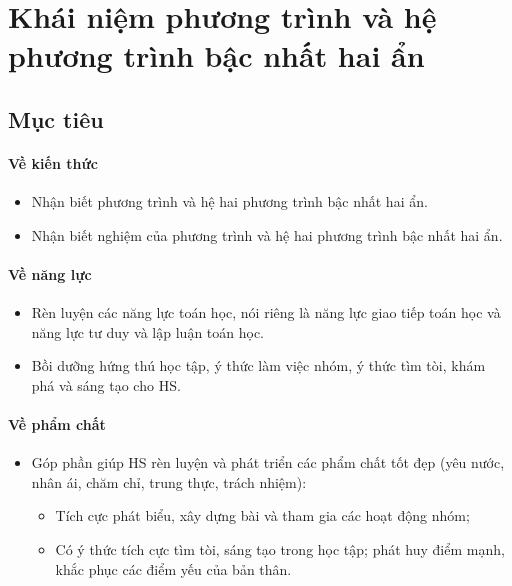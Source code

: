 \section
{Khái niệm phương trình \xuongdong và hệ phương trình bậc nhất hai ẩn}

\subsection{Mục tiêu}

\paragraph{Về kiến thức}

\begin{itemize}
    \item Nhận biết phương trình và hệ hai phương trình bậc nhất hai ẩn.
    \item Nhận biết nghiệm của phương trình và hệ hai phương trình bậc nhất hai ẩn. 
\end{itemize}

\paragraph{Về năng lực}

\begin{itemize}
    \item Rèn luyện các năng lực toán học, nói riêng là năng lực giao tiếp toán học và năng lực tư duy và lập luận toán học. 
    \item Bồi dưỡng hứng thú học tập, ý thức làm việc nhóm, ý thức tìm tòi, khám phá và sáng tạo cho HS. 
\end{itemize}

\paragraph{Về phẩm chất}

\begin{itemize}
    \item Góp phần giúp HS rèn luyện và phát triển các phẩm chất tốt đẹp (yêu nước, nhân ái, chăm chỉ, trung thực, trách nhiệm): 
    \begin{itemize}
        \item Tích cực phát biểu, xây dựng bài và tham gia các hoạt động nhóm; 
        \item Có ý thức tích cực tìm tòi, sáng tạo trong học tập; phát huy điểm mạnh, khắc phục các điểm yếu của bản thân. 
    \end{itemize}
\end{itemize}


